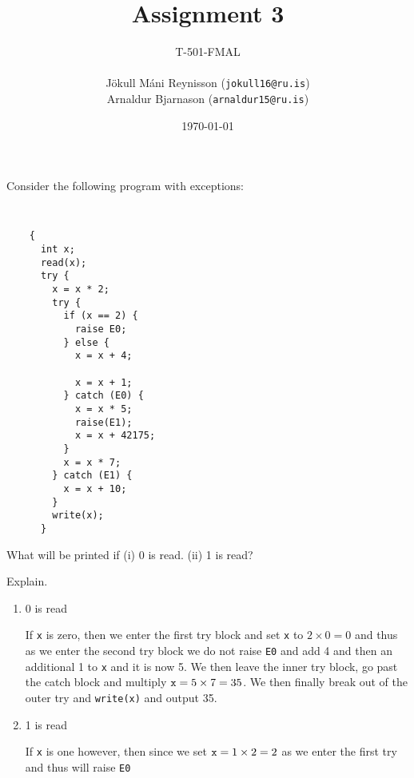 \documentclass[11pt]{exam}
\begin{document}
\title{Assignment 3}
    \author{{\small T-501-FMAL} \\ \quad \\ Jökull Máni Reynisson ({\tt jokull16@ru.is}) \\  Arnaldur Bjarnason ({\tt arnaldur15@ru.is})}
\date{\today}
\maketitle

\begin{questions}


\question Consider the following program with exceptions:
{\tt
  \begin{lstlisting}
    {
      int x;
      read(x);
      try {
        x = x * 2;
        try {
          if (x == 2) {
            raise E0;
          } else {
            x = x + 4;

            x = x + 1;
          } catch (E0) {
            x = x * 5;
            raise(E1);
            x = x + 42175;
          }
          x = x * 7;
        } catch (E1) {
          x = x + 10;
        }
        write(x);
      }
  \end{lstlisting}
}
What will be printed if (i) 0 is read. (ii) 1 is read?

Explain.

        \begin{enumerate}[label=(\roman*)]
            \item 0 is read
                \begin{framed}
                    If {\tt x} is zero, then we enter the first try block and set {\tt x} to $2\times 0 = 0$ and thus as we enter the second try block we do not raise {\tt E0} and add 4 and then an additional 1 to {\tt x} and it is now 5. We then leave the inner try block, go past the catch block and multiply ${\tt x} = 5 \times 7 = 35$. 
                    We then finally break out of the outer try and {\tt write(x)} and output 35.
                \end{framed}

            \item 1 is read
                \begin{framed}
                    If {\tt x} is one however, then since we set ${\tt x} = 1 \times 2 = 2$ as we enter the first try and thus will raise {\tt E0} 
                \end{framed}
        \end{enumerate}




\end{questions}
\end{document}
